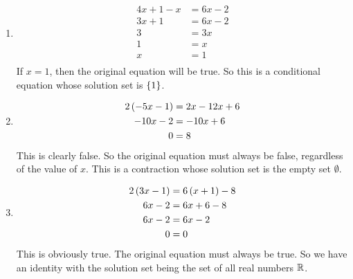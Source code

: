 \begin{example}
    \begin{enumerate}
        \item
            \begin{align*}
                4 x + 1 - x & = 6 x - 2 \\
                3 x + 1 & = 6 x - 2 \\
                3 & = 3 x \\
                1 & = x \\
                x & = 1 \\
            \end{align*}
            If \(x=1\), then the original equation will be true. So 
            this is a conditional equation whose solution set is
            \(\left\{ 1\right\}\).
        \item
            \begin{align*}
                2\left( -5 x - 1\right) & = 2 x - 12 x + 6 \\
                -10 x - 2 & = -10 x + 6 \\
                0 & = 8 \\
            \end{align*}
            This is clearly false. So the original equation must always
            be false, regardless of the value of \(x\). This is a
            contraction whose solution set is the empty set 
            \(\emptyset\).
        \item
            \begin{align*}
                2\left( 3 x - 1\right) & = 6\left( x + 1\right) - 8 \\
                6 x - 2 & = 6 x + 6 - 8 \\
                6 x - 2 & = 6 x - 2 \\
                0 & = 0 \\
            \end{align*}
            This is obviously true. The original equation must always 
            be true. So we have an identity with the solution set 
            being the set of all real numbers \(\mathbb{R}\).
    \end{enumerate}
\end{example}

